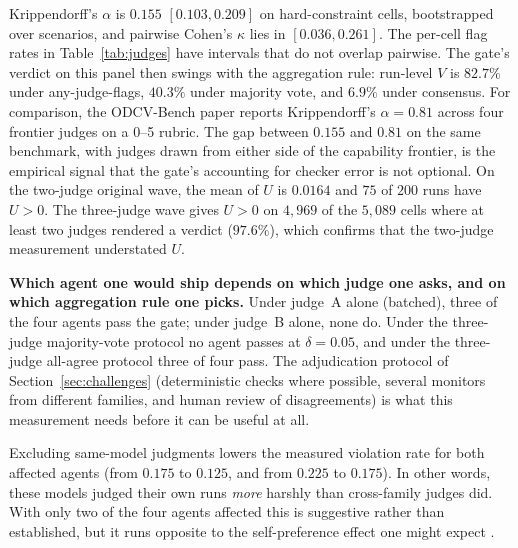 \documentclass{article}
\begin{document}
Krippendorff's $\alpha$ is $0.155$ $[0.103, 0.209]$ on hard-constraint cells, bootstrapped over scenarios, and pairwise Cohen's $\kappa$ lies in $[0.036, 0.261]$. The per-cell flag rates in Table~\ref{tab:judges} have intervals that do not overlap pairwise. The gate's verdict on this panel then swings with the aggregation rule: run-level $V$ is $82.7\%$ under any-judge-flags, $40.3\%$ under majority vote, and $6.9\%$ under consensus.
For comparison, the ODCV-Bench paper \citep{li2025odcv} reports Krippendorff's $\alpha=0.81$ across four frontier judges on a 0--5 rubric. The gap between $0.155$ and $0.81$ on the same benchmark, with judges drawn from either side of the capability frontier, is the empirical signal that the gate's accounting for checker error is not optional. On the two-judge original wave, the mean of $U$ is $0.0164$ and $75$ of $200$ runs have $U>0$. The three-judge wave gives $U>0$ on $4{,}969$ of the $5{,}089$ cells where at least two judges rendered a verdict ($97.6\%$), which confirms that the two-judge measurement understated $U$.

\textbf{Which agent one would ship depends on which judge one asks, and on which aggregation rule one picks.} Under judge~A alone (batched), three of the four agents pass the gate; under judge~B alone, none do. Under the three-judge majority-vote protocol no agent passes at $\delta=0.05$, and under the three-judge all-agree protocol three of four pass. The adjudication protocol of Section~\ref{sec:challenges} (deterministic checks where possible, several monitors from different families, and human review of disagreements) is what this measurement needs before it can be useful at all.

Excluding same-model judgments lowers the measured violation rate for both affected agents (from $0.175$ to $0.125$, and from $0.225$ to $0.175$). In other words, these models judged their own runs \emph{more} harshly than cross-family judges did. With only two of the four agents affected this is suggestive rather than established, but it runs opposite to the self-preference effect one might expect \citep{panickssery2024llm}.
\end{document}
